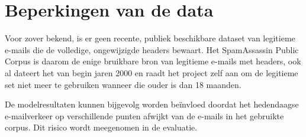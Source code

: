 \section{Beperkingen van de data}%
\label{sec:beperkingen-data}

Voor zover bekend, is er geen recente, publiek beschikbare dataset van legitieme e-mails die de volledige, ongewijzigde headers bewaart. Het SpamAssassin Public Corpus is daarom de enige bruikbare bron van legitieme e-mails met headers, ook al dateert het van begin jaren 2000 en raadt het project zelf aan om de legitieme set niet meer te gebruiken wanneer die ouder is dan 18 maanden.

De modelresultaten kunnen bijgevolg worden beïnvloed doordat het hedendaagse e-mailverkeer op verschillende punten afwijkt van de e-mails in het gebruikte corpus. Dit risico wordt meegenomen in de evaluatie.